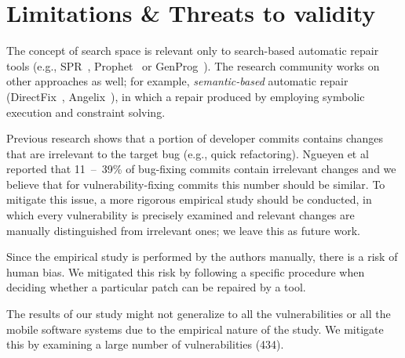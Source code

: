 \section{Limitations \& Threats to validity}

The concept of search space is relevant only to search-based automatic repair tools (e.g., SPR~\cite{long2015staged}, Prophet~\cite{long2015prophet} or GenProg~\cite{le2012systematic}).
The research community works on other approaches as well; for example, \emph{semantic-based} automatic repair (DirectFix~\cite{directfix}, Angelix~\cite{mechtaev2016angelix}), in which a repair produced by employing symbolic execution and constraint solving.

Previous research shows that a portion of developer commits contains changes that are irrelevant to the target bug (e.g., quick refactoring).
Ngueyen et al~\cite{nguyen2013filtering} reported that 11~--~39\% of bug-fixing commits contain irrelevant changes and we believe that for vulnerability-fixing commits this number should be similar.
To mitigate this issue, a more rigorous empirical study should be conducted, in which every vulnerability is precisely examined and relevant changes are manually distinguished from irrelevant ones; we leave this as future work.

Since the empirical study is performed by the authors manually, there is a risk of human bias.
We mitigated this risk by following a specific procedure when deciding whether a particular patch can be repaired by a tool.

The results of our study might not generalize to all the vulnerabilities or all the mobile software systems due to the empirical nature of the study.
We mitigate this by examining a large number of vulnerabilities (434).
